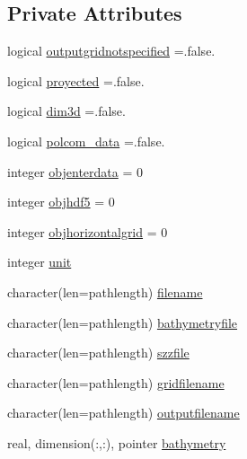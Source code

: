 \subsection*{Private Attributes}
\begin{DoxyCompactItemize}
\item 
logical \mbox{\hyperlink{structmodulecfformat_1_1t__cfformat_ad466da4313022df41d6a35c2b549debd}{outputgridnotspecified}} =.false.
\item 
logical \mbox{\hyperlink{structmodulecfformat_1_1t__cfformat_aa2209923f02ea9cce3c4bbfb2e424339}{proyected}} =.false.
\item 
logical \mbox{\hyperlink{structmodulecfformat_1_1t__cfformat_ae4213149879fa0959ec5bb80cbbb4561}{dim3d}} =.false.
\item 
logical \mbox{\hyperlink{structmodulecfformat_1_1t__cfformat_a95b606c64b5a921e20176affc6f24a64}{polcom\+\_\+data}} =.false.
\item 
integer \mbox{\hyperlink{structmodulecfformat_1_1t__cfformat_ad06ef78e4ec2ac7528a88b9ae1e88b30}{objenterdata}} = 0
\item 
integer \mbox{\hyperlink{structmodulecfformat_1_1t__cfformat_a6974220a3dffaa97ecbc19a9723d596f}{objhdf5}} = 0
\item 
integer \mbox{\hyperlink{structmodulecfformat_1_1t__cfformat_aec9dd0b7872a981c05cdb164c46863ae}{objhorizontalgrid}} = 0
\item 
integer \mbox{\hyperlink{structmodulecfformat_1_1t__cfformat_a9e8fc94c4c8a859b46c8d1bf17f642cb}{unit}}
\item 
character(len=pathlength) \mbox{\hyperlink{structmodulecfformat_1_1t__cfformat_aadc0b0981584460938d2c4d2d66269a2}{filename}}
\item 
character(len=pathlength) \mbox{\hyperlink{structmodulecfformat_1_1t__cfformat_a944e5b5abeddd566339eafbbaaedb483}{bathymetryfile}}
\item 
character(len=pathlength) \mbox{\hyperlink{structmodulecfformat_1_1t__cfformat_a6e478bbd072e379a551c6c262bd6c15a}{szzfile}}
\item 
character(len=pathlength) \mbox{\hyperlink{structmodulecfformat_1_1t__cfformat_a5a77406fc1373113f3e3d16d717091c3}{gridfilename}}
\item 
character(len=pathlength) \mbox{\hyperlink{structmodulecfformat_1_1t__cfformat_a89204016b0468543d28fd4f25c38c100}{outputfilename}}
\item 
real, dimension(\+:,\+:), pointer \mbox{\hyperlink{structmodulecfformat_1_1t__cfformat_ae47bfd570e37c1f46a133c289fbb10c1}{bathymetry}}

\end{DoxyCompactItemize}

